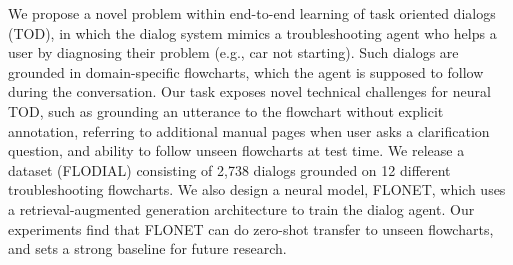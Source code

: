 We propose a novel problem within end-to-end learning of task oriented dialogs (TOD), in which the dialog system mimics a troubleshooting agent who helps a user by diagnosing their problem (e.g., car not starting). Such dialogs are grounded in domain-specific flowcharts, which the agent is supposed to follow during the conversation. Our task exposes novel technical challenges for neural TOD, such as grounding an utterance to the flowchart without explicit annotation, referring to additional manual pages when user asks a clarification question, and ability to follow unseen flowcharts at test time.  We release a dataset (FLODIAL) consisting of 2,738 dialogs grounded on 12 different troubleshooting flowcharts. We also design a neural model, FLONET, which uses a retrieval-augmented generation architecture to train the dialog agent. Our experiments find that FLONET can do zero-shot transfer to unseen flowcharts, and sets a strong baseline for future research.
